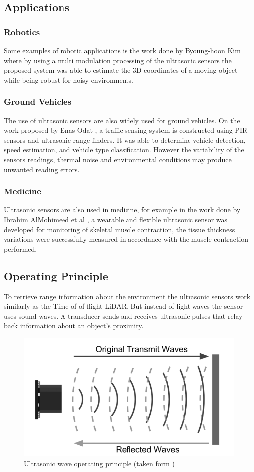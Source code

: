 \subsection{Applications}
\subsubsection{Robotics}
Some examples of robotic applications is the work done by Byoung-hoon Kim \cite{kim2006improved} where by using a multi modulation processing of the ultrasonic sensors the proposed system was able to estimate the 3D coordinates of a moving object while being robust for noisy environments.
\subsubsection{Ground Vehicles}
The use of ultrasonic sensors are also widely used for ground vehicles. On the work  proposed by Enas Odat \cite{pir}, a traffic sensing system is constructed using \ac{PIR} sensors and ultrasonic range finders. It was able to determine  vehicle detection, speed estimation, and vehicle type classification. However the variability of the sensors readings, thermal noise and environmental conditions may produce unwanted reading errors.
\subsubsection{Medicine}
Ultrasonic sensors are also used in medicine, for example in the work done by Ibrahim AlMohimeed et al \cite{med}, a wearable and flexible ultrasonic sensor was developed for monitoring of skeletal muscle contraction, the tissue thickness variations were successfully measured in accordance with the muscle contraction performed. 
\subsection{Operating Principle}
To retrieve range information about the environment the ultrasonic sensors work similarly as the  Time of of flight \ac{LiDAR}. But instead of light waves the sensor uses sound waves. A transducer sends and receives ultrasonic pulses that relay back information about an object’s proximity.  

\begin{figure}[ht] 
\centerline{\includegraphics [width=0.8 \textwidth]{imgs/chapter2/us.png}}
\caption[Ultrasonic wave operating principle]{Ultrasonic wave operating principle (taken form \cite{burnett2019})}
\label{fig:us}
\end{figure}

